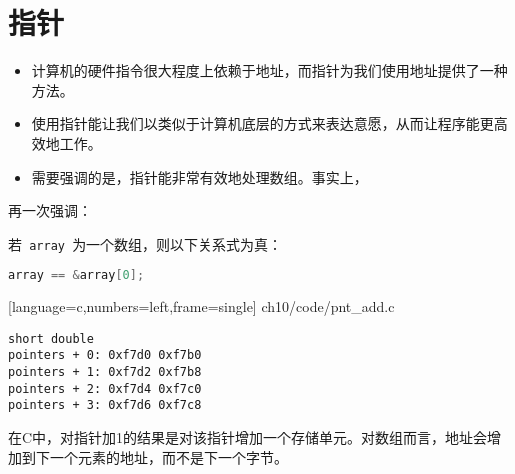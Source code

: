 \section{指针}
\begin{frame}[fragile]\ft{\secname}
\begin{itemize}
\item
计算机的硬件指令很大程度上依赖于地址，而指针为我们使用地址提供了一种方法。\\[0.1in]
\item
使用指针能让我们以类似于计算机底层的方式来表达意愿，从而让程序能更高效地工作。\\[0.1in]
\item 
需要强调的是，指针能非常有效地处理数组。事实上，
\end{itemize}
\end{frame}


\begin{frame}[fragile]\ft{\secname}
再一次强调：
\pause \vspace{0.2in}

若\lstinline| array |为一个数组，则以下关系式为真：
\begin{lstlisting}[language=c,backgroundcolor=\color{red!20}]
array == &array[0];
\end{lstlisting}
\end{frame}


\begin{frame}\ft{\secname}
  
  [language=c,numbers=left,frame=single]
  {ch10/code/pnt_add.c}
\end{frame}


\begin{frame}[fragile]\ft{\secname}

\begin{lstlisting}[backgroundcolor=\color{red!20}]
               short double
pointers + 0: 0xf7d0 0xf7b0
pointers + 1: 0xf7d2 0xf7b8
pointers + 2: 0xf7d4 0xf7c0
pointers + 3: 0xf7d6 0xf7c8
\end{lstlisting}
\end{frame}


\begin{frame}[fragile]\ft{\secname}
在C中，对指针加1的结果是对该指针增加一个存储单元。对数组而言，地址会增加到下一个元素的地址，而不是下一个字节。
\end{frame}


